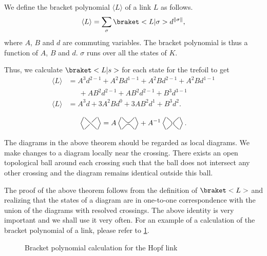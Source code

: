 We define the bracket polynomial \(\langle L\rangle\) of a link \(L\) as follows. \[\langle L \rangle = \sum_\sigma\braket<L|\sigma> d^{\norm{\sigma}},\] where \(A\), \(B\) and \(d\) are commuting variables. The bracket polynomial is thus a function of \(A\), \(B\) and \(d\). \(\sigma\) runs over all the states of \(K\).

Thus, we calculate \(\braket<L|s>\) for each state for the trefoil to get
\begin{align*}
    \langle L\rangle &= A^3d^{2-1} + A^2Bd^{1-1} + A^2Bd^{2-1} + A^2Bd^{1-1}\\
					 &\phantom{=\,} + AB^2d^{2-1} + AB^2d^{2-1} + B^3d^{3-1}\\
	\langle L\rangle &= A^3d + 3A^2Bd^0 + 3AB^2d^1 + B^3d^2.
\end{align*}

\begin{thm}
    \[\BB = A\BD + A^{-1}\BE.\]
\end{thm}

The diagrams in the above theorem should be regarded as local diagrams. We make changes to a diagram locally near the crossing. There exists an open topological ball around each crossing such that the ball does not intersect any other crossing and the diagram remains identical outside this ball.

The proof of the above theorem follows from the definition of \(\braket<L>\) and realizing that the states of a diagram are in one-to-one correspondence with the union of the diagrams with resolved crossings. The above identity is very important and we shall use it very often. For an example of a calculation of the bracket polynomial of a link, please refer to \cref{fig:hopflinkbracket}.

\begin{figure}
    \centering
	
	\caption{Bracket polynomial calculation for the Hopf link}
	\label{fig:hopflinkbracket}
\end{figure}

